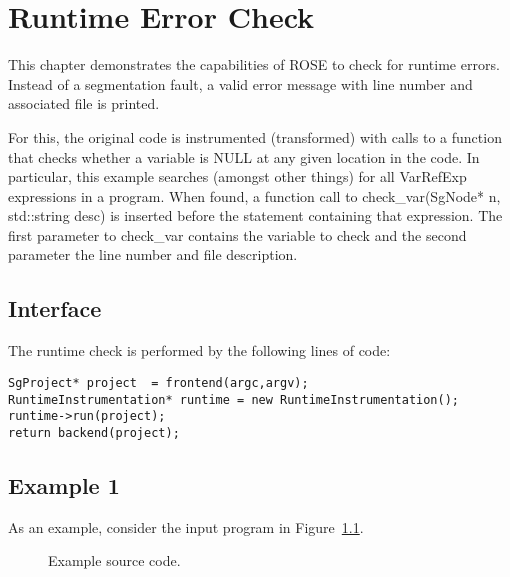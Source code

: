 \chapter{Runtime Error Check}

This chapter demonstrates the capabilities of ROSE to check for runtime errors. Instead of a segmentation fault,
a valid error message with line number and associated file is printed.

For this, the original code is instrumented (transformed) with calls to a function that checks whether a variable is NULL at 
any given location in the code. In particular, this example searches (amongst other things) for all VarRefExp expressions in a program.
When found, a function call to check\_var(SgNode* n, std::string desc) is inserted before the statement containing that expression.
The first parameter to check\_var contains the variable to check and the second parameter the line number and file description.

\section{Interface}

The runtime check is performed by the following lines of code:


\begin{verbatim}
SgProject* project  = frontend(argc,argv);
RuntimeInstrumentation* runtime = new RuntimeInstrumentation();
runtime->run(project);
return backend(project); 
\end{verbatim}


\section{Example 1}

As an example, consider the input program in Figure~\ref{Tutorial:exampledefuseCode}.

\begin{figure}[!h]
{\indent
{\mySmallFontSize
\begin{latexonly}
   
\end{latexonly}

\begin{htmlonly}
   
\end{htmlonly}

}
}
\caption{Example source code.}
\label{Tutorial:exampledefuseCode}
\end{figure}

